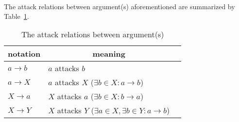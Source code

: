 The attack relations between argument(s) aforementioned are summarized by Table~\ref{tab: attack-relation}. 



\begin{table}[ht!]
    \centering
    \caption{The attack relations between argument(s)}
    \label{tab: attack-relation}
    \renewcommand{\arraystretch}{1.3}
    \begin{tabular}{l||ll}
    \hline
    \multicolumn{1}{c||}{notation} & 
    \multicolumn{1}{c}{meaning} \\
    \hline

    $a \to b$ & 
    $a$ attacks $b$  \\

    $a \to X$ &  
    $a$ attacks $X$ ($\exists b \in X: a \to b$) \\ 

    $X \to a$  &  
    $X$ attacks $a$  ($\exists b \in X: b \to a$) \\

    
    $X \to Y$ &
    $X$ attacks $Y$ 
    ($\exists a \in X, \exists b \in Y: a \to b$)  \\



    \hline
\end{tabular}
\end{table}


















